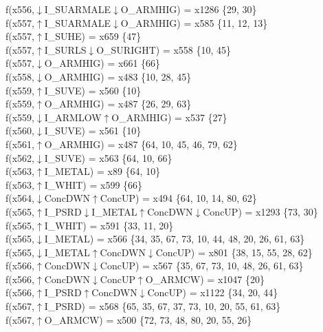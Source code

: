f(x556,$\downarrow$I\_SUARMALE$\downarrow$O\_ARMHIG) = x1286 \{29, 30\} \\  
f(x557,$\uparrow$I\_SUARMALE$\downarrow$O\_ARMHIG) = x585 \{11, 12, 13\} \\  
f(x557,$\uparrow$I\_SUHE) = x659 \{47\} \\  
f(x557,$\uparrow$I\_SURLS$\downarrow$O\_SURIGHT) = x558 \{10, 45\} \\  
f(x557,$\downarrow$O\_ARMHIG) = x661 \{66\} \\  
f(x558,$\downarrow$O\_ARMHIG) = x483 \{10, 28, 45\} \\  
f(x559,$\uparrow$I\_SUVE) = x560 \{10\} \\  
f(x559,$\uparrow$O\_ARMHIG) = x487 \{26, 29, 63\} \\  
f(x559,$\downarrow$I\_ARMLOW$\uparrow$O\_ARMHIG) = x537 \{27\} \\  
f(x560,$\downarrow$I\_SUVE) = x561 \{10\} \\  
f(x561,$\uparrow$O\_ARMHIG) = x487 \{64, 10, 45, 46, 79, 62\} \\  
f(x562,$\downarrow$I\_SUVE) = x563 \{64, 10, 66\} \\  
f(x563,$\uparrow$I\_METAL) = x89 \{64, 10\} \\  
f(x563,$\uparrow$I\_WHIT) = x599 \{66\} \\  
f(x564,$\downarrow$ConcDWN$\uparrow$ConcUP) = x494 \{64, 10, 14, 80, 62\} \\  
f(x565,$\uparrow$I\_PSRD$\downarrow$I\_METAL$\uparrow$ConcDWN$\downarrow$ConcUP) = x1293 \{73, 30\} \\  
f(x565,$\uparrow$I\_WHIT) = x591 \{33, 11, 20\} \\  
f(x565,$\downarrow$I\_METAL) = x566 \{34, 35, 67, 73, 10, 44, 48, 20, 26, 61, 63\} \\  
f(x565,$\downarrow$I\_METAL$\uparrow$ConcDWN$\downarrow$ConcUP) = x801 \{38, 15, 55, 28, 62\} \\  
f(x566,$\uparrow$ConcDWN$\downarrow$ConcUP) = x567 \{35, 67, 73, 10, 48, 26, 61, 63\} \\  
f(x566,$\uparrow$ConcDWN$\downarrow$ConcUP$\uparrow$O\_ARMCW) = x1047 \{20\} \\  
f(x566,$\uparrow$I\_PSRD$\uparrow$ConcDWN$\downarrow$ConcUP) = x1122 \{34, 20, 44\} \\  
f(x567,$\uparrow$I\_PSRD) = x568 \{65, 35, 67, 37, 73, 10, 20, 55, 61, 63\} \\  
f(x567,$\uparrow$O\_ARMCW) = x500 \{72, 73, 48, 80, 20, 55, 26\} \\  
